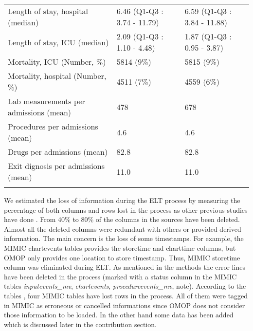 \begin{table*}[t]
\begin{tabular}{@{}lll@{}}
Length of stay, hospital (median)      & 6.46 (Q1-Q3 : 3.74 - 11.79) & 6.59 (Q1-Q3 : 3.84 - 11.88)        \\
Length of stay, ICU (median)           & 2.09 (Q1-Q3 : 1.10 - 4.48)  & 1.87 (Q1-Q3 : 0.95 - 3.87)         \\
Mortality, ICU (Number, \%)            & 5814 (9\%)                  & 5815 (9\%)                         \\
Mortality, hospital (Number, \%)       & 4511 (7\%)                  & 4559 (6\%)                         \\
Lab measurements per admissions (mean) & 478                         & 678                                \\
Procedures per admissions (mean)       & 4.6                         & 4.6                                \\
Drugs per admissions (mean)            & 82.8                        & 82.8                               \\
Exit dignosis per admissions (mean)    & 11.0                        & 11.0                               \\\botrule
\end{tabular}
\label{table:statistics}
\end{table*}


%
%
We estimated the loss of information during the ELT process by measuring the
percentage of both columns and rows lost in the process as other previous
studies have done \cite{omop-nashville}.
From 40\% to 80\% of the columns in the sources have been deleted. Almost
all the deleted columns were redundant with others or provided derived
information. The main concern is the loss of some timestamps. For example, the
MIMIC chartevents tables provides the storetime and charttime columns, but OMOP
only provides one location to store timestamp. Thus, MIMIC storetime column was
eliminated during ELT. As mentioned in the methods the error lines have been
deleted in the process (marked with a status column in the MIMIC tables
\textit{inputevents\_mv}, \textit{chartevents}, \textit{procedureevents\_mv}, note).
According to the tables \cite{lostrows}, four MIMIC tables have lost rows in
the process. All of them were tagged in MIMIC as erroneous or cancelled
informations since OMOP does not consider those information to be loaded.
In the other hand some data has been added which is discussed later in the
contribution section.

